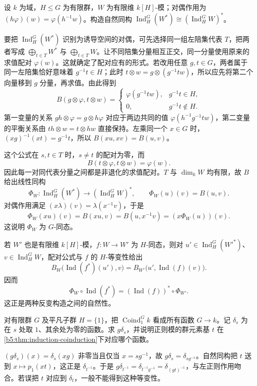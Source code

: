 \begin{exercise}\label{b5:ex:03-induced-dual}
	设 \(k\) 为域，\(H\le G\) 为有限群，\(W\) 为有限维 \(k[H]\)-模；对偶作用为 \((h\varphi)(w)=\varphi(h^{-1}w)\)。构造自然同构 \(\operatorname{Ind}_H^G(W^*)\cong(\operatorname{Ind}_H^G W)^*\)。
\end{exercise}
\begin{solution}
	要把 \(\operatorname{Ind}_H^G(W^*)\) 识别为诱导空间的对偶，可先选择同一组左陪集代表 \(T\)，把两者写成 \(\bigoplus_{t\in T}W^*\) 与 \(\bigoplus_{t\in T}W\)。让不同陪集分量相互正交，同一分量使用原来的求值配对 \(\varphi(w)\)。这就确定了配对应有的形式。若改用任意 \(g,t\in G\)，两者属于同一左陪集恰好意味着 \(g^{-1}t\in H\)；此时 \(t\otimes w=g\otimes(g^{-1}tw)\)，所以应先将第二个向量移到 \(g\) 分量，再求值。由此得到
	\[
		B(g\otimes\varphi,t\otimes w)=
		\begin{cases}\varphi(g^{-1}tw),&g^{-1}t\in H,\\0,&g^{-1}t\notin H.\end{cases}
	\]
	第一变量的关系 \(gh\otimes\varphi=g\otimes h\varphi\) 对应于两边共同的值 \(\varphi(h^{-1}g^{-1}tw)\)，第二变量的平衡关系由 \(t h\otimes w=t\otimes hw\) 直接保持。左乘同一个 \(x\in G\) 时，\((xg)^{-1}(xt)=g^{-1}t\)，所以 \(B(xu,xv)=B(u,v)\)。

	这个公式在 \(s,t\in T\) 时，\(s\ne t\) 的配对为零，而
	\[
		B(t\otimes\varphi,t\otimes w)=\varphi(w).
	\]
	因此每一对同代表分量之间都是非退化的求值配对。\(T\) 与 \(\dim_k W\) 均有限，故 \(B\) 给出线性同构
	\[
		\Phi_W:\operatorname{Ind}_H^G(W^*)\longrightarrow (\operatorname{Ind}_H^G W)^*,\qquad \Phi_W(u)(v)=B(u,v).
	\]
	对偶作用满足 \((x\lambda)(v)=\lambda(x^{-1}v)\)，于是
	\[
		\Phi_W(xu)(v)=B(xu,v)=B(u,x^{-1}v) =(x\Phi_W(u))(v).
	\]
	这说明 \(\Phi_W\) 为 \(G\)-同态。

	若 \(W'\) 也是有限维 \(k[H]\)-模，\(f:W\rightarrow W'\) 为 \(H\)-同态，则对 \(u'\in\operatorname{Ind}_H^G(W'^*)\)、\(v\in\operatorname{Ind}_H^G W\)，配对公式与 \(f\) 的 \(H\)-等变性给出
	\[
		B_W\bigl(\operatorname{Ind}(f^*)(u'),v\bigr) =B_{W'}\bigl(u',\operatorname{Ind}(f)(v)\bigr).
	\]
	因而
	\[
		\Phi_W\circ\operatorname{Ind}(f^*) =(\operatorname{Ind}(f))^*\circ\Phi_{W'}.
	\]
	这正是两种反变构造之间的自然性。
\end{solution}

\begin{exercise}\label{b5:ex:03-function-basis}
	对有限群 \(G\) 及平凡子群 \(H=\{1\}\)，把 \(\operatorname{Coind}_1^G k\) 看成所有函数 \(G\rightarrow k\)。记 \(\delta_s\) 为在 \(s\) 处取 \(1\)、其余处为零的函数。求 \(g\delta_s\)，并说明正则模的群元素基 \(t\) 在\cref{b5:thm:induction-coinduction}下对应哪个函数。
\end{exercise}
\begin{solution}
	\((g\delta_s)(x)=\delta_s(xg)\) 非零当且仅当 \(x=sg^{-1}\)，故 \(g\delta_s=\delta_{sg^{-1}}\)。自然同构把 \(t\) 送到 \(x\mapsto p_1(xt)\)，这正是 \(\delta_{t^{-1}}\)。于是 \(g\delta_{t^{-1}}=\delta_{t^{-1}g^{-1}}=\delta_{(gt)^{-1}}\)，与左正则作用吻合。若误把 \(t\) 对应到 \(\delta_t\)，一般不能得到这种等变性。
\end{solution}

